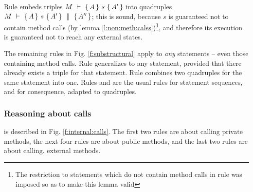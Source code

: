 {Rule {} embeds  triples  ${\hproves{M}  {A} {\ s\ }{A'} }$  into quadruples ${M\ \vdash\ \{\,A\, \} \ s\  \{\,A'\, \}\, \,\parallel\,\, \{\, A'' \, \} }$; this is sound, because $s$ is guaranteed not to contain method calls (by lemma \ref{l:non:meth:calss})\footnote{The restriction to statements which do not contain method calls in rule {} was imposed so as to make this lemma valid}, and therefore its execution is guaranteed not to reach any external states.

 
The remaining rules in Fig. \ref{f:substructural} apply to \emph{any} statements -- even those containing method calls.
 Rule {} generalizes {} to any statement, provided that  there already exists a triple for that statement.
Rule {} combines two quadruples for the same statement into one.
Rules  {} and  {} are the usual rules for statement sequences, and for consequence, adapted to quadruples.



\subsubsection{Reasoning about   calls}
is described in Fig. \ref{f:internal:calls}. The first two rules are about calling private methods,  the next four rules are about public methods, and the last two rules
are about calling. external methods.


}
